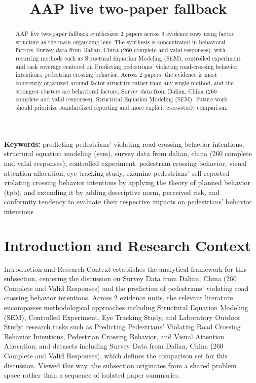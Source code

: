\documentclass{article}
\title{AAP live two-paper fallback}
\begin{document}
\maketitle
\begin{abstract}
AAP live two-paper fallback synthesizes 2 papers across 9 evidence rows using factor structure as the main organizing lens. The synthesis is concentrated in behavioral factors, Survey data from Dalian, China (260 complete and valid responses), with recurring methods such as Structural Equation Modeling (SEM), controlled experiment and task coverage centered on Predicting pedestrians' violating road-crossing behavior intentions, pedestrian crossing behavior. Across 2 papers, the evidence is most coherently organized around factor structure rather than any single method, and the strongest clusters are behavioral factors, Survey data from Dalian, China (260 complete and valid responses), Structural Equation Modeling (SEM). Future work should prioritize standardized reporting and more explicit cross-study comparison.
\end{abstract}
\noindent\textbf{Keywords:} predicting pedestrians' violating road-crossing behavior intentions, structural equation modeling (sem), survey data from dalian, china (260 complete and valid responses), controlled experiment, pedestrian crossing behavior, visual attention allocation, eye tracking study, examine pedestrians' self-reported violating crossing behavior intentions by applying the theory of planned behavior (tpb), and extending it by adding descriptive norm, perceived risk, and conformity tendency to evaluate their respective impacts on pedestrians' behavior intentions
\section{Introduction and Research Context}
Introduction and Research Context establishes the analytical framework for this subsection, centering the discussion on Survey Data from Dalian, China (260 Complete and Valid Responses) and the prediction of pedestrians' violating road crossing behavior intentions. Across 2 evidence units, the relevant literature encompasses methodological approaches including Structural Equation Modeling (SEM), Controlled Experiment, Eye Tracking Study, and Laboratory Outdoor Study; research tasks such as Predicting Pedestrians' Violating Road Crossing Behavior Intentions, Pedestrian Crossing Behavior, and Visual Attention Allocation; and datasets including Survey Data from Dalian, China (260 Complete and Valid Responses), which defines the comparison set for this discussion. Viewed this way, the subsection originates from a shared problem space rather than a sequence of isolated paper summaries. \cite{08_2016_zhou_aap,09_2018_jiang_aap}
\end{document}
